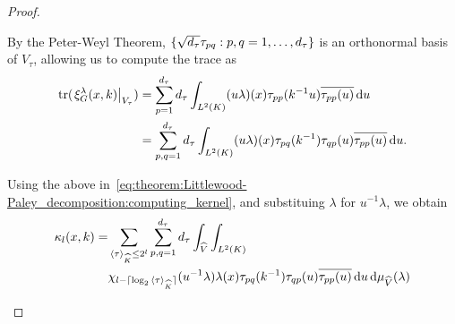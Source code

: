 \begin{proof}
\begin{description}
            By the Peter-Weyl Theorem,
            $\{ \sqrt{{d_{\tau}}} \tau_{pq} : p, q = 1, \dots, {d_{\tau}} \}$
            is an orthonormal basis of $V_\tau$,
            allowing us to compute the trace as
            \begin{align*}
                \operatorname{tr}( \left. \xi^{\lambda}_{G}(x, k) \right|_{V_\tau})
                &= \sum_{p = 1}^{d_{\tau}}
                    {d_{\tau}}
                    \int_{L^{2} (K)}
                    (u \lambda)(x) \tau_{pp}(k^{-1} u) \overline{\tau_{pp}(u)}
                    \,\mathrm{d} u\\
                &= \sum_{p,q = 1}^{d_{\tau}}
                    {d_{\tau}}
                    \int_{L^{2} (K)}
                        (u \lambda)(x) \tau_{pq}(k^{-1}) \tau_{q p}(u) \overline{\tau_{pp}(u)}
                    \,\mathrm{d} u.
            \end{align*}

            Using the above in~\eqref{eq:theorem:Littlewood-Paley_decomposition:computing_kernel},
            and substituing $\lambda$ for $u^{-1} \lambda$,
            we obtain
            \begin{align}
                \kappa_l (x, k)
                = &\sum_{{\langle \tau \rangle}_{{\widehat{K}}} \leq 2^l}
                        \sum_{p,q = 1}^{d_{\tau}}
                        {d_{\tau}}
                        \int_{\widehat{V}}
                                \int_{L^{2} (K)} \notag\\
                                    &\chi_{l - \lceil\log_2 {\langle \tau \rangle}_{{\widehat{K}}}\rceil}(u^{-1}\lambda) \lambda(x) \tau_{pq}(k^{-1}) \tau_{qp}(u) \overline{\tau_{pp}(u)}
                                \,\mathrm{d} u
                            \,\mathrm{d} \mu_{{\widehat{V}}}(\lambda)
                    \label{eq:theorem:Littlewood-Paley_decomposition:computing_kernel:2}
            \end{align}


\end{description}
\end{proof}
